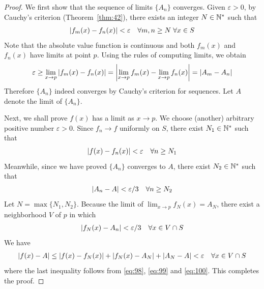 \documentclass[thmcnt=section, 12pt]{my-elegantbook}
\begin{document}
\begin{proof}
    We first show that the sequence of limits $\{A_n\}$ converges. Given $\varepsilon > 0$, by Cauchy's criterion (Theorem~\ref{thm:42}), there exists an integer $N \in \mathbb{N}^\ast$ such that
    \begin{align*}
        \left\lvert f_m(x) - f_n(x) \right\rvert < \varepsilon
        \quad \forall m,n \geq N \; \forall x \in S
    \end{align*}
    Note that the absolute value function is continuous and both $f_m(x)$ and $f_n(x)$ have limits at point $p$. Using the rules of computing limits, we obtain
    \begin{align*}
        \varepsilon \geq \lim_{x \to p} \left\lvert f_m(x) - f_n(x) \right\rvert
        = \left\lvert  \lim_{x \to p} f_m(x) - \lim_{x \to p} f_n(x)  \right\rvert
        = \left\lvert A_m - A_n \right\rvert
    \end{align*}
    Therefore $\{A_n\}$ indeed converges by Cauchy's criterion for sequences. Let $A$ denote the limit of $\{A_n\}$.

    Next, we shall prove $f(x)$ has a limit as $ x \to p$. We choose (another) arbitrary positive number $\varepsilon > 0$. Since $f_n \to f$ uniformly on $S$, there exist $N_1 \in \mathbb{N}^\ast$ such that 
    \begin{align}
        \left\lvert f(x) - f_n(x) \right\rvert < \varepsilon
        \quad \forall n \geq N_1
        \label{eq:98}
    \end{align}
    Meanwhile, since we have proved $\{A_n\}$ converges to $A$, there exist $N_2 \in \mathbb{N}^\ast$ such that 
    \begin{align}
        \left\lvert A_n - A \right\rvert
        < \varepsilon / 3
        \quad \forall n \geq N_2
        \label{eq:99}
    \end{align}
    Let $N = \max\{N_1, N_2\}$. Because the limit of $\lim_{x \to p} f_N(x) = A_N$, there exist a neighborhood $V$ of $p$ in which
    \begin{align}
        \left\lvert f_N(x) - A_n \right\rvert < \varepsilon / 3
        \quad \forall x \in V \cap S
        \label{eq:100}
    \end{align}
    We have 
    \begin{align*}
        \left\lvert f(x) - A \right\rvert
        \leq \left\lvert f(x) - f_N(x) \right\rvert
        + \left\lvert f_N(x) - A_N \right\rvert
        + \left\lvert A_N - A \right\rvert
        < \varepsilon
        \quad \forall x \in V \cap S
    \end{align*}
    where the last inequality follows from \eqref{eq:98}, \eqref{eq:99} and \eqref{eq:100}. This completes the proof.
\end{proof}
\end{document}
